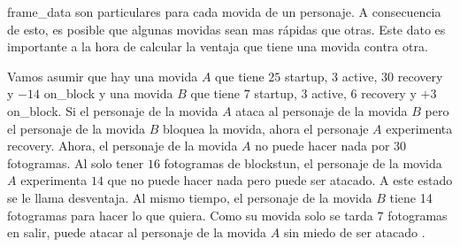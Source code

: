 \gls{frame_data} son particulares para cada movida de un personaje. A consecuencia de esto, es posible que algunas movidas sean mas rápidas que otras. Este dato es importante a la hora de calcular la ventaja que tiene una movida contra otra. 

Vamos asumir que hay una movida $A$ que tiene $25$ \gls{startup}, $3$ \gls{active}, $30$ \gls{recovery} y $-14$ \gls{on_block} y una movida $B$ que tiene $7$ \gls{startup}, $3$ \gls{active}, $6$ \gls{recovery} y $+3$ \gls{on_block}. Si el personaje de la movida $A$ ataca al personaje de la movida $B$ pero el personaje de la movida $B$ bloquea la movida, ahora el personaje $A$ experimenta \gls{recovery}. Ahora, el personaje de la movida $A$ no puede hacer nada por $30$ fotogramas. Al solo tener $16$ fotogramas de \gls{blockstun}, el personaje de la movida $A$ experimenta $14$ que no puede hacer nada pero puede ser atacado. A este estado se le llama desventaja. Al mismo tiempo, el personaje de la movida $B$ tiene 14 fotogramas para hacer lo que quiera. Como su movida solo se tarda $7$ fotogramas en salir, puede atacar al personaje de la movida $A$ sin miedo de ser atacado \cite{noauthor_fighting_nodate}.